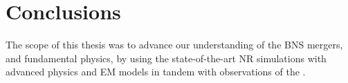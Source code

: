 \chapter{Conclusions}\label{ch:conclusion} %



The scope of this thesis was to advance our understanding of the \ac{BNS} mergers,
and fundamental physics, by using the state-of-the-art \ac{NR} simulations with
advanced physics and \ac{EM} models in tandem with \mm{} observations of the 
\GW{}. 






